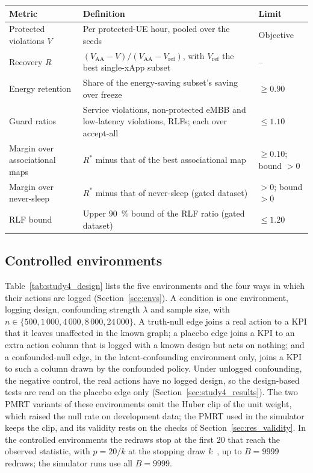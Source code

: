 \begin{table}[tbp]
\par\medskip

\begin{tabular*}{\textwidth}{@{\extracolsep{\fill}}>{\raggedright}p{}>{\raggedright}p{}>{\raggedright\arraybackslash}p{}@{}}
\toprule
Metric & Definition & Limit \\
\midrule
Protected violations $V$ & Per protected-UE hour, pooled over the seeds & Objective \\
Recovery $R$ & $(V_{\mathrm{AA}} - V) / (V_{\mathrm{AA}} - V_{\mathrm{ref}})$, with $V_{\mathrm{ref}}$ the best single-xApp subset & -- \\
Energy retention & Share of the energy-saving subset's saving over freeze & $\ge 0.90$ \\
Guard ratios & Service violations, non-protected eMBB and low-latency violations, RLFs; each over accept-all & $\le 1.10$ \\
Margin over associational maps & $R^{*}$ minus that of the best associational map & $\ge 0.10$; bound $> 0$ \\
Margin over never-sleep & $R^{*}$ minus that of never-sleep (gated dataset) & $> 0$; bound $> 0$ \\
RLF bound & Upper 90~\% bound of the RLF ratio (gated dataset) & $\le 1.20$ \\
\bottomrule
\end{tabular*}
\end{table}

\subsection{Controlled environments}
\label{app:envs}

Table~\ref{tab:study4_design} lists the five environments and the four ways in which their actions are logged
(Section~\ref{sec:envs}). A condition is one environment, logging design, confounding strength $\lambda$ and sample
size, with $n \in \{500, 1\,000, 4\,000, 8\,000, 24\,000\}$. A truth-null edge joins a real action to a KPI that it leaves
unaffected in the known graph; a placebo edge joins a KPI to an extra action column that is logged with a known design
but acts on nothing; and a confounded-null edge, in the latent-confounding environment only, joins a KPI to such a
column drawn by the confounded policy. Under unlogged confounding, the negative control, the real actions have no logged
design, so the design-based tests are read on the placebo edge only (Section~\ref{sec:study4_results}). The two PMRT
variants of these environments omit the Huber clip of the unit weight, which raised the null rate on development data;
the PMRT used in the simulator keeps the clip, and its validity rests on the checks of Section~\ref{sec:res_validity}. In the controlled environments the redraws stop at the first 20 that reach the observed statistic, with $p = 20 / k$ at the stopping draw $k$~\cite{besag1991sequential}, up to $B = 9999$ redraws; the simulator runs use all $B = 9999$.


